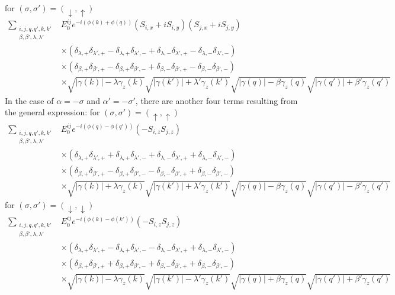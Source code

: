 for $(\sigma, \sigma') =(\downarrow, \uparrow)$
\begin{align}
    \sum_{\substack{i, j, q,q', k, k'\\ \beta, \beta', \lambda, \lambda'}} &E^{ij}_0 e^{-i(\phi(k)+\phi(q))} \left(S_{i,x}+iS_{i,y}\right) \left( S_{j,x}+iS_{j,y}\right) \\ \nonumber
   &\times \left( \delta_{\lambda,+}\delta_{\lambda',+} -\delta_{\lambda,+}\delta_{\lambda',-}+ \delta_{\lambda,-}\delta_{\lambda',+}-\delta_{\lambda,-}\delta_{\lambda',-}\right)\\\nonumber
   &\times \left( \delta_{\beta,+}\delta_{\beta',+} - \delta_{\beta,+}\delta_{\beta',-}+ \delta_{\beta,-}\delta_{\beta',+}-\delta_{\beta,-}\delta_{\beta',-}\right)\\\nonumber
   &\times \sqrt{|\gamma(k)|-\lambda\gamma_z(k)}\sqrt{|\gamma(k')|+ \lambda'\gamma_z(k')}\sqrt{|\gamma(q)|-\beta\gamma_z(q)}\sqrt{|\gamma(q')|+ \beta'\gamma_z(q')}
\end{align}
In the case of $\alpha = - \sigma$ and $\alpha' = -\sigma'$, there are another four terms resulting from the general expression: \newline
for $(\sigma, \sigma') = (\uparrow, \uparrow)$
\begin{align}
    \sum_{\substack{i, j, q,q', k, k'\\ \beta, \beta', \lambda, \lambda'}} &E^{ij}_0 e^{-i(\phi(q)-\phi(q'))} \left(-S_{i,z} S_{j,z}\right) \\ \nonumber
   &\times \left( \delta_{\lambda,+}\delta_{\lambda',+} + \delta_{\lambda,+}\delta_{\lambda',-}+ \delta_{\lambda,-}\delta_{\lambda',+}+\delta_{\lambda,-}\delta_{\lambda',-}\right)\\\nonumber
   &\times \left( \delta_{\beta,+}\delta_{\beta',+} - \delta_{\beta,+}\delta_{\beta',-}- \delta_{\beta,-}\delta_{\beta',+}+\delta_{\beta,-}\delta_{\beta',-}\right)\\\nonumber
   &\times \sqrt{|\gamma(k)|+ \lambda\gamma_z(k)}\sqrt{|\gamma(k')|+ \lambda'\gamma_z(k')}\sqrt{|\gamma(q)|-\beta\gamma_z(q)}\sqrt{|\gamma(q')|-\beta'\gamma_z(q')}
\end{align}
for $(\sigma, \sigma') =(\downarrow, \downarrow)$
\begin{align}
    \sum_{\substack{i, j, q,q', k, k'\\ \beta, \beta', \lambda, \lambda'}} &E^{ij}_0 e^{-i(\phi(k)-\phi(k'))}\left(-S_{i,z} S_{j,z}\right) \\ \nonumber
   &\times \left( \delta_{\lambda,+}\delta_{\lambda',+} - \delta_{\lambda,+}\delta_{\lambda',-}- \delta_{\lambda,-}\delta_{\lambda',+}+\delta_{\lambda,-}\delta_{\lambda',-}\right)\\\nonumber
   &\times \left( \delta_{\beta,+}\delta_{\beta',+} + \delta_{\beta,+}\delta_{\beta',-}+ \delta_{\beta,-}\delta_{\beta',+}+\delta_{\beta,-}\delta_{\beta',-}\right)\\\nonumber
   &\times \sqrt{|\gamma(k)|-\lambda \gamma_z(k)}\sqrt{|\gamma(k')|-\lambda'\gamma_z(k')}\sqrt{|\gamma(q)|+ \beta\gamma_z(q)}\sqrt{|\gamma(q')|+ \beta'\gamma_z(q')}
\end{align}
